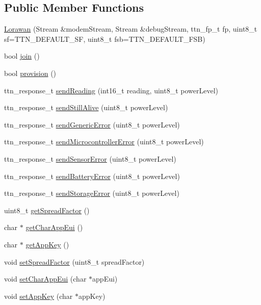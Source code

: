 \subsection*{Public Member Functions}
\begin{DoxyCompactItemize}
\item 
\mbox{\hyperlink{class_lorawan_ad406457b082f8ae38594aa7daf632d1f}{Lorawan}} (Stream \&modem\+Stream, Stream \&debug\+Stream, ttn\+\_\+fp\+\_\+t fp, uint8\+\_\+t sf=T\+T\+N\+\_\+\+D\+E\+F\+A\+U\+L\+T\+\_\+\+SF, uint8\+\_\+t fsb=T\+T\+N\+\_\+\+D\+E\+F\+A\+U\+L\+T\+\_\+\+F\+SB)
\item 
bool \mbox{\hyperlink{class_lorawan_a590a79393a24359a9cc69bb133f72d56}{join}} ()
\item 
bool \mbox{\hyperlink{class_lorawan_ad8e01477e0f83ffd15a75309ee94ecc2}{provision}} ()
\item 
ttn\+\_\+response\+\_\+t \mbox{\hyperlink{class_lorawan_a0a82173d537813a749766aec6ae58fe8}{send\+Reading}} (int16\+\_\+t reading, uint8\+\_\+t power\+Level)
\item 
ttn\+\_\+response\+\_\+t \mbox{\hyperlink{class_lorawan_ae070b6740ad21efb2bd3355af0f49792}{send\+Still\+Alive}} (uint8\+\_\+t power\+Level)
\item 
ttn\+\_\+response\+\_\+t \mbox{\hyperlink{class_lorawan_acf1283d8a62ea919fec60a3634944576}{send\+Generic\+Error}} (uint8\+\_\+t power\+Level)
\item 
ttn\+\_\+response\+\_\+t \mbox{\hyperlink{class_lorawan_ac57100cd65b5f9f5aea4e0cd8c24dd12}{send\+Microcontroller\+Error}} (uint8\+\_\+t power\+Level)
\item 
ttn\+\_\+response\+\_\+t \mbox{\hyperlink{class_lorawan_a53f239940033d3a5630f4876911038f6}{send\+Sensor\+Error}} (uint8\+\_\+t power\+Level)
\item 
ttn\+\_\+response\+\_\+t \mbox{\hyperlink{class_lorawan_acf1ef0ac8ce453bccc0d08347af071f0}{send\+Battery\+Error}} (uint8\+\_\+t power\+Level)
\item 
ttn\+\_\+response\+\_\+t \mbox{\hyperlink{class_lorawan_a8d5565a2257a87ad9b39d78ea2ad38b8}{send\+Storage\+Error}} (uint8\+\_\+t power\+Level)
\item 
uint8\+\_\+t \mbox{\hyperlink{class_lorawan_ab24ea4c1ed2f9fdc6f64d9c0fe64ca60}{get\+Spread\+Factor}} ()
\item 
char $\ast$ \mbox{\hyperlink{class_lorawan_a2d454c9a1216a5ae80c3c20c6a3b5e32}{get\+Char\+App\+Eui}} ()
\item 
char $\ast$ \mbox{\hyperlink{class_lorawan_a2a95dfcf1dc5868cd6e8a5fb8c4e5231}{get\+App\+Key}} ()
\item 
void \mbox{\hyperlink{class_lorawan_a58ab6ca02b1c7e1f57618818ece5e86b}{set\+Spread\+Factor}} (uint8\+\_\+t spread\+Factor)
\item 
void \mbox{\hyperlink{class_lorawan_a0b79ba499200cd96859d518a47306fa9}{set\+Char\+App\+Eui}} (char $\ast$app\+Eui)
\item 
void \mbox{\hyperlink{class_lorawan_a0971c9c87d2a731bb5779953243a7016}{set\+App\+Key}} (char $\ast$app\+Key)
\end{DoxyCompactItemize}


